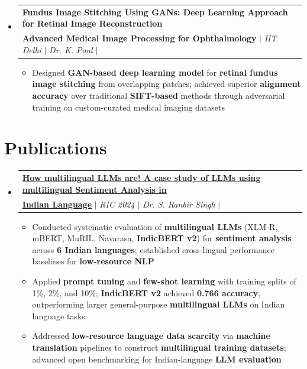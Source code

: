 \documentclass[a4paper, 11pt]{article}
\makeatletter
\newcommand{\resumeItemWithoutTitle}[1]{
  \item\small{
    {#1 \vspace{-2pt}}
      {\vspace{-2pt}}
  }
}
\newcommand{\resumeSubheadingPro}[2]{
  \vspace{-2pt}\item
  \begin{tabular*}{0.97\textwidth}{l@{\extracolsep{\fill}}r}
    #1 & {\textit {\small{#2}}} \\
  \end{tabular*}\vspace{-7pt}
}
\newcommand{\resumeSubHeadingListStart}{\begin{itemize}[leftmargin=*,
      label={}]}
\newcommand{\resumeSubHeadingListEnd}{\end{itemize}}
\newcommand{\resumeItemListStart}{\begin{itemize}}
\newcommand{\resumeItemListEnd}{\end{itemize}\vspace{-2pt}}
\makeatother
\begin{document}
\resumeSubHeadingListStart
\resumeSubheadingPro
{{{\textbf{Fundus Image Stitching Using GANs: Deep Learning Approach for Retinal Image Reconstruction}}} \\
{{{\textbf{Advanced Medical Image Processing for Ophthalmology}}}} $|$ \emph{IIT Delhi} $|$ \emph{Dr. K. Paul} $|$
\href{https://github.com/AnubhavBhattachayra/Image-stitching}{\faIcon{github}}}{}
\resumeItemListStart
\resumeItemWithoutTitle
{Designed \textbf{GAN-based deep learning model} for \textbf{retinal fundus image stitching} from overlapping patches; achieved superior \textbf{alignment accuracy} over traditional \textbf{SIFT-based} methods through adversarial training on custom-curated medical imaging datasets}
\resumeItemListEnd
\resumeSubHeadingListEnd







\section{Publications}
\resumeSubHeadingListStart
\resumeSubheadingPro
{\href{https://github.com/AnubhavBhattachayra/MultililingualLLM-Sentiment}{{\textbf{How multilingual LLMs are! A case study of LLMs using multilingual Sentiment Analysis in}}} \\
{\href{https://github.com/AnubhavBhattachayra/multilingual-Sentiment-Analysis-in-Indian-Language}{{\textbf{Indian Language}}}} $|$ \emph{RIC 2024} $|$ \emph{Dr. S. Ranbir Singh} $|$
\href{https://github.com/AnubhavBhattachayra/MultililingualLLM-Sentiment}{\faIcon{github}}}{}
\resumeItemListStart
\resumeItemWithoutTitle
{Conducted systematic evaluation of \textbf{multilingual LLMs} (XLM-R, mBERT, MuRIL, Navarasa, \textbf{IndicBERT v2}) for \textbf{sentiment analysis} across \textbf{6 Indian languages}; established cross-lingual performance baselines for \textbf{low-resource NLP}}
\resumeItemWithoutTitle
{Applied \textbf{prompt tuning} and \textbf{few-shot learning} with training splits of 1\%, 2\%, and 10\%; \textbf{IndicBERT v2} achieved \textbf{0.766 accuracy}, outperforming larger general-purpose \textbf{multilingual LLMs} on Indian language tasks}
\resumeItemWithoutTitle
{Addressed \textbf{low-resource language data scarcity} via \textbf{machine translation} pipelines to construct \textbf{multilingual training datasets}; advanced open benchmarking for Indian-language \textbf{LLM evaluation}}
\resumeItemListEnd
\resumeSubHeadingListEnd
\end{document}

